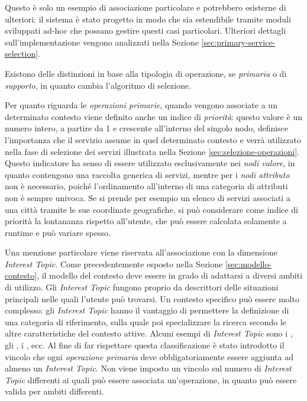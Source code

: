 Questo è solo un esempio di associazione particolare e potrebbero esisterne di ulteriori: il sistema è stato progetto in modo che sia estendibile tramite moduli sviluppati ad-hoc che possano gestire questi casi particolari. Ulteriori dettagli sull'implementazione vengono analizzati nella Sezione \ref{sec:primary-service-selection}.

Esistono delle distinzioni in base alla tipologia di operazione, se \emph{primaria} o di \emph{supporto}, in quanto cambia l'algoritmo di selezione.

Per quanto riguarda le \emph{operazioni primarie}, quando vengono associate a un determinato contesto viene definito anche un indice di \emph{priorità}: questo valore è un numero intero, a partire da 1 e crescente all'interno del singolo nodo, definisce l'importanza che il servizio assume in quel determinato contesto e verrà utilizzato nella fase di selezione dei servizi illustrata nella Sezione \ref{sec:selezione-operazioni}. Questo indicatore ha senso di essere utilizzato esclusivamente nei \emph{nodi valore}, in quanto contengono una raccolta generica di servizi, mentre per i \emph{nodi attributo} non è necessario, poiché l'ordinamento all'interno di una categoria di attributi non è sempre univoca. Se si prende per esempio un elenco di servizi associati a una città tramite le sue coordinate geografiche, si può considerare come indice di priorità la lontananza rispetto all'utente, che può essere calcolata solamente a runtime e può variare spesso.

Una menzione particolare viene riservata all'associazione con la dimensione \emph{Interest Topic}. Come precedentemente esposto nella Sezione \ref{sec:modello-contesto}, il modello del contesto deve essere in grado di adattarsi a diversi ambiti di utilizzo. Gli \emph{Interest Topic} fungono proprio da descrittori delle situazioni principali nelle quali l'utente può trovarsi. Un contesto specifico può essere molto complesso: gli \emph{Interest Topic} hanno il vantaggio di permettere la definizione di una categoria di riferimento, sulla quale poi specializzare la ricerca secondo le altre caratteristiche del contesto attive. Alcuni esempi di \emph{Interest Topic} sono i , gli , i , ecc.
Al fine di far rispettare questa classificazione è stato introdotto il vincolo che ogni \emph{operazione primaria} deve obbligatoriamente essere aggiunta ad almeno un \emph{Interest Topic}. Non viene imposto un vincolo sul numero di \emph{Interest Topic} differenti ai quali può essere associata un'operazione, in quanto può essere valida per ambiti differenti.

